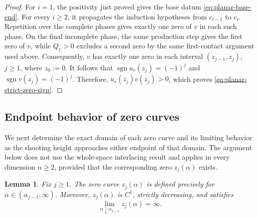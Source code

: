 \documentclass[11pt]{article}
\newtheorem{lemma}[theorem]{Lemma}
\begin{document}
\begin{proof}
For $i=1$, the positivity just proved gives the base datum
\eqref{eq:planar-base-end}. For every $i\ge2$, it propagates the induction
hypotheses from $c_{i-1}$ to $c_i$. Repetition over the complete phases gives exactly
one zero of $v$ in each such phase. {On the final incomplete phase, the
same production step gives the first zero of $v$, while $Q_1>0$ excludes a
second zero by the same first-contact argument used above.} Consequently, $v$ has exactly one zero in
each interval $(z_{j-1},z_j)$, $j\geq1$, where $z_0:=0$. It follows that
 $\operatorname{sgn}u_r(z_j)=(-1)^j$ and $\operatorname{sgn}v(z_j)=(-1)^j$.
Therefore, $u_r(z_j)v(z_j)>0$,
which proves \eqref{eq:planar-strict-zero-sign}.
\end{proof}

\subsection{Endpoint behavior of zero curves}
We next determine the exact domain of each zero curve and its limiting behavior as the shooting height approaches either endpoint of that domain. The argument below does not use the whole-space interlacing result and applies in every dimension $n\geq2$, provided that the corresponding zero $z_j(\alpha)$ exists.

\begin{lemma}\label{lem:log-left}
Fix $j\geq1$. The zero curve $z_j(\alpha)$ is defined precisely for $\alpha\in(\alpha_{j-1},\infty)$. Moreover, $z_j(\alpha)$ is $C^1$, strictly decreasing, and satisfies
\begin{equation}\label{eq:z-infty}
 \lim_{\alpha\downarrow\alpha_{j-1}}z_j(\alpha)=\infty.
\end{equation}
\end{lemma}
\end{document}
